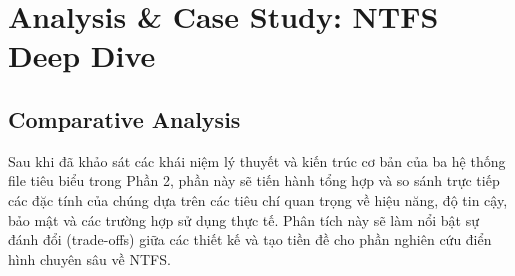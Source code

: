 \documentclass[12pt]{article}
\begin{document}

\section{Analysis \& Case Study: NTFS Deep Dive}


\subsection{Comparative Analysis}

Sau khi đã khảo sát các khái niệm lý thuyết và kiến trúc cơ bản của ba hệ thống file tiêu biểu trong Phần 2, phần này sẽ tiến hành tổng hợp và so sánh trực tiếp các đặc tính của chúng dựa trên các tiêu chí quan trọng về hiệu năng, độ tin cậy, bảo mật và các trường hợp sử dụng thực tế. Phân tích này sẽ làm nổi bật sự đánh đổi (trade-offs) giữa các thiết kế và tạo tiền đề cho phần nghiên cứu điển hình chuyên sâu về NTFS.
\end{document}
